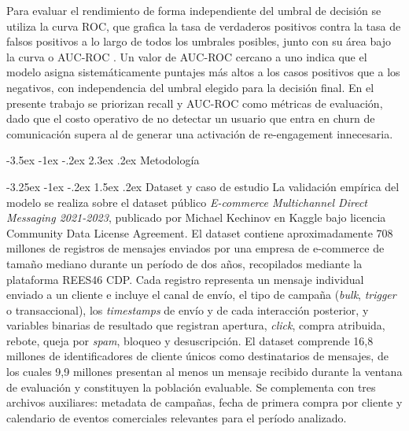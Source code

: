 \documentclass[11pt,a4paper]{article}
\makeatletter
\renewcommand\section{\@startsection{section}{1}{\z@}%
  {-3.5ex \@plus -1ex \@minus -.2ex}%
  {2.3ex \@plus.2ex}%
  {\normalfont\normalsize\centering}}
\renewcommand\subsection{\@startsection{subsection}{2}{\z@}%
  {-3.25ex \@plus -1ex \@minus -.2ex}%
  {1.5ex \@plus .2ex}%
  {\normalfont\normalsize\itshape}}
\makeatother
\begin{document}
Para evaluar el rendimiento de forma independiente del umbral de decisión se utiliza la curva ROC, que grafica la tasa de verdaderos positivos contra la tasa de falsos positivos a lo largo de todos los umbrales posibles, junto con su área bajo la curva o AUC-ROC \cite{fawcett2006introduction}. Un valor de AUC-ROC cercano a uno indica que el modelo asigna sistemáticamente puntajes más altos a los casos positivos que a los negativos, con independencia del umbral elegido para la decisión final. En el presente trabajo se priorizan recall y AUC-ROC como métricas de evaluación, dado que el costo operativo de no detectar un usuario que entra en churn de comunicación supera al de generar una activación de re-engagement innecesaria.
 
 

\section{Metodología}
 
\subsection{Dataset y caso de estudio}
La validación empírica del modelo se realiza sobre el dataset público \textit{E-commerce Multichannel Direct Messaging 2021-2023}, publicado por Michael Kechinov en Kaggle bajo licencia Community Data License Agreement. El dataset contiene aproximadamente 708 millones de registros de mensajes enviados por una empresa de e-commerce de tamaño mediano durante un período de dos años, recopilados mediante la plataforma REES46 CDP. Cada registro representa un mensaje individual enviado a un cliente e incluye el canal de envío, el tipo de campaña (\textit{bulk}, \textit{trigger} o transaccional), los \textit{timestamps} de envío y de cada interacción posterior, y variables binarias de resultado que registran apertura, \textit{click}, compra atribuida, rebote, queja por \textit{spam}, bloqueo y desuscripción. El dataset comprende 16,8 millones de identificadores de cliente únicos como destinatarios de mensajes, de los cuales 9,9 millones presentan al menos un mensaje recibido durante la ventana de evaluación y constituyen la población evaluable. Se complementa con tres archivos auxiliares: metadata de campañas, fecha de primera compra por cliente y calendario de eventos comerciales relevantes para el período analizado.
\end{document}
